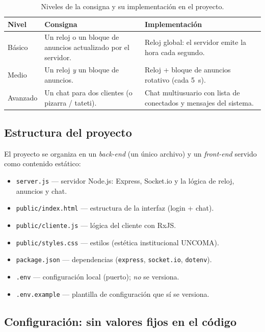 \documentclass[12pt,a4paper]{article}
\begin{document}
\begin{table}[H]
\centering
\caption{Niveles de la consigna y su implementación en el proyecto.}
\label{tab:niveles}
\renewcommand{\arraystretch}{1.4}
\begin{tabular}{@{}>{\raggedright\arraybackslash}p{2.2cm} >{\raggedright\arraybackslash}p{5.5cm} >{\raggedright\arraybackslash}p{5.5cm}@{}}
\toprule
\textbf{Nivel} & \textbf{Consigna} & \textbf{Implementación} \\
\midrule
Básico & Un reloj o un bloque de anuncios actualizado por el servidor. & Reloj global: el servidor emite la hora cada segundo. \\
Medio & Un reloj \emph{y} un bloque de anuncios. & Reloj + bloque de anuncios rotativo (cada 5~s). \\
Avanzado & Un chat para dos clientes (o pizarra / tateti). & Chat multiusuario con lista de conectados y mensajes del sistema. \\
\bottomrule
\end{tabular}
\end{table}

\subsection{Estructura del proyecto}

El proyecto se organiza en un \textit{back-end} (un único archivo) y un \textit{front-end} servido como contenido estático:

\begin{itemize}[leftmargin=1.4em]
    \item \texttt{server.js} — servidor Node.js: Express, Socket.io y la lógica de reloj, anuncios y chat.
    \item \texttt{public/index.html} — estructura de la interfaz (login + chat).
    \item \texttt{public/cliente.js} — lógica del cliente con RxJS.
    \item \texttt{public/styles.css} — estilos (estética institucional UNCOMA).
    \item \texttt{package.json} — dependencias (\texttt{express}, \texttt{socket.io}, \texttt{dotenv}).
    \item \texttt{.env} — configuración local (puerto); \emph{no} se versiona.
    \item \texttt{.env.example} — plantilla de configuración que sí se versiona.
\end{itemize}

\subsection{Configuración: sin valores fijos en el código}
\label{sec:config}
\end{document}
